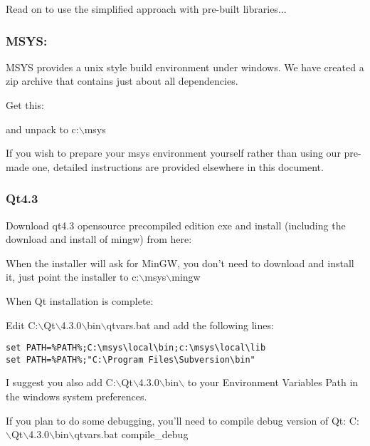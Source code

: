 
Read on to use the simplified approach with pre-built libraries...

\subsubsection{MSYS:}
MSYS provides a unix style build environment under windows. We have created a
zip archive that contains just about all dependencies.

Get this: 


and unpack to c:$\backslash$msys

If you wish to prepare your msys environment yourself rather than using 
our pre-made one, detailed instructions are provided elsewhere in this
document.

\subsubsection{Qt4.3}
Download qt4.3 opensource precompiled edition exe and install (including the
download and install of mingw) from here:


When the installer will ask for MinGW, you don't need to download and install
it, just point the installer to c:$\backslash$msys$\backslash$mingw

When Qt installation is complete:

Edit C:$\backslash$Qt$\backslash$4.3.0$\backslash$bin$\backslash$qtvars.bat and add the following lines:

\begin{verbatim}
set PATH=%PATH%;C:\msys\local\bin;c:\msys\local\lib 
set PATH=%PATH%;"C:\Program Files\Subversion\bin" 
\end{verbatim}

I suggest you also add C:$\backslash$Qt$\backslash$4.3.0$\backslash$bin$\backslash$ to your Environment Variables Path in
the windows system preferences.

If you plan to do some debugging, you'll need to compile debug version of Qt:
C:$\backslash$Qt$\backslash$4.3.0$\backslash$bin$\backslash$qtvars.bat compile\_debug


